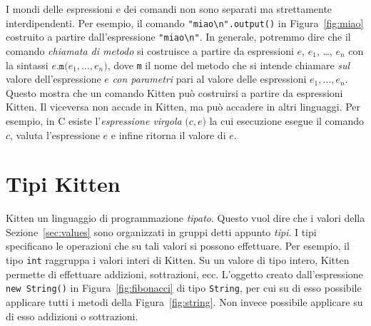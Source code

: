 I mondi delle espressioni e dei comandi non sono separati ma strettamente
interdipendenti. Per esempio, il comando
\verb|"miao\n".output()| in Figura~\ref{fig:miao} \e costruito a partire
dall'espressione \verb|"miao\n"|. In generale, potremmo dire che il
comando \emph{chiamata di metodo} si costruisce a partire da espressioni
$e$, $e_1$, \ldots, $e_n$ con la sintassi
$e\mathtt{.m(}e_1,\ldots,e_n\mathtt{)}$, dove \texttt{m} \e il nome del
metodo che si intende chiamare \emph{sul} valore dell'espressione
$e$ \emph{con parametri} pari al valore delle espressioni $e_1,\ldots,e_n$.
Questo mostra che un comando Kitten pu\`o costruirsi a partire da espressioni
Kitten. Il viceversa non accade in Kitten, ma pu\`o accadere
in altri linguaggi. Per esempio, in C esiste
l'\emph{espressione virgola} $\mathtt{(}c\mathtt{,}e\mathtt{)}$ la cui
esecuzione esegue il comando $c$, valuta l'espressione $e$ e infine
ritorna il valore di $e$.
%
\section{Tipi Kitten}\label{sec:types}
%
Kitten \e un linguaggio di programmazione \emph{tipato}. Questo vuol dire
che i valori della Sezione~\ref{sec:values} sono organizzati in gruppi
detti appunto \emph{tipi}. I tipi specificano le operazioni che su tali
valori si possono effettuare. Per esempio, il tipo \texttt{int} raggruppa
i valori interi di Kitten. Su un valore di tipo intero, Kitten permette di
effettuare addizioni, sottrazioni, ecc. L'oggetto creato dall'espressione
\texttt{new String()} in Figura~\ref{fig:fibonacci} \e di tipo \texttt{String},
per cui su di esso \e possibile applicare tutti i metodi della
Figura~\ref{fig:string}. Non \e invece possibile applicare su di esso
addizioni o sottrazioni.

